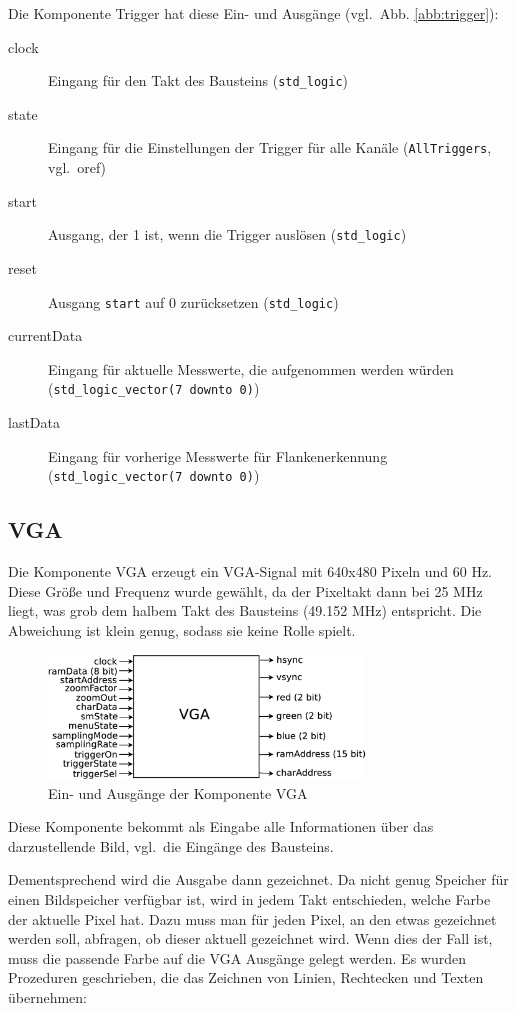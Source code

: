 \documentclass[IN,ngerman,utf8,12pt]{tumbook}
\newcommand{\vgl}{vgl.\ }
\begin{document}
Die Komponente Trigger hat diese Ein- und Ausgänge (\vgl Abb. \ref{abb:trigger}):

\begin{description}
    \item[clock] Eingang für den Takt des Bausteins (\texttt{std\_logic})
    \item[state] Eingang für die Einstellungen der Trigger für alle Kanäle (\texttt{AllTriggers}, \vgl o{ref})
    \item[start] Ausgang, der 1 ist, wenn die Trigger auslösen (\texttt{std\_logic})
    \item[reset] Ausgang \texttt{start} auf 0 zurücksetzen (\texttt{std\_logic})
    \item[currentData] Eingang für aktuelle Messwerte, die aufgenommen werden würden (\texttt{std\_logic\_vector(7 downto 0)})
    \item[lastData] Eingang für vorherige Messwerte für Flankenerkennung (\texttt{std\_logic\_vector(7 downto 0)})
\end{description}

\subsection{VGA}

Die Komponente VGA erzeugt ein VGA-Signal mit 640x480 Pixeln und 60 Hz.
Diese Größe und Frequenz wurde gewählt, da der Pixeltakt dann bei 25 MHz liegt, was grob dem halbem Takt des Bausteins (49.152 MHz) entspricht.
Die Abweichung ist klein genug, sodass sie keine Rolle spielt.

\begin{figure}[H]
    \centerline{
        \includegraphics[width=0.75\textwidth]{img/vga}
    }
    \label{abb:vga}
    \caption{Ein- und Ausgänge der Komponente VGA}
\end{figure}

Diese Komponente bekommt als Eingabe alle Informationen über das darzustellende Bild, \vgl die Eingänge des Bausteins.

Dementsprechend wird die Ausgabe dann gezeichnet.
Da nicht genug Speicher für einen Bildspeicher verfügbar ist, wird in jedem Takt entschieden, welche Farbe der aktuelle Pixel hat.
Dazu muss man für jeden Pixel, an den etwas gezeichnet werden soll, abfragen, ob dieser aktuell gezeichnet wird.
Wenn dies der Fall ist, muss die passende Farbe auf die VGA Ausgänge gelegt werden.
Es wurden Prozeduren geschrieben, die das Zeichnen von Linien, Rechtecken und Texten übernehmen:
\end{document}
